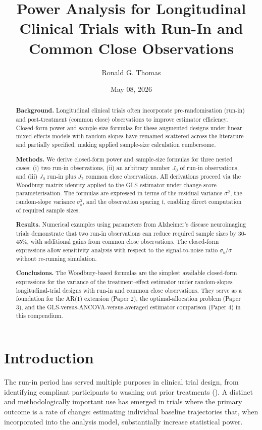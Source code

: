 \documentclass[
  11pt,
]{article}
\title{Power Analysis for Longitudinal Clinical Trials with Run-In and
Common Close Observations}
\author{Ronald G. Thomas}
\date{May 08, 2026}
\begin{document}
\maketitle
\begin{abstract}
\textbf{Background.} Longitudinal clinical trials often incorporate
pre-randomisation (run-in) and post-treatment (common close)
observations to improve estimator efficiency. Closed-form power and
sample-size formulas for these augmented designs under linear
mixed-effects models with random slopes have remained scattered across
the literature and partially specified, making applied sample-size
calculation cumbersome.

\textbf{Methods.} We derive closed-form power and sample-size formulas
for three nested cases: (i) two run-in observations, (ii) an arbitrary
number \(J_0\) of run-in observations, and (iii) \(J_0\) run-in plus
\(J_2\) common close observations. All derivations proceed via the
Woodbury matrix identity applied to the GLS estimator under change-score
parameterisation. The formulas are expressed in terms of the residual
variance \(\sigma^2\), the random-slope variance \(\sigma_b^2\), and the
observation spacing \(t\), enabling direct computation of required
sample sizes.

\textbf{Results.} Numerical examples using parameters from Alzheimer's
disease neuroimaging trials demonstrate that two run-in observations can
reduce required sample sizes by 30-45\%, with additional gains from
common close observations. The closed-form expressions allow sensitivity
analysis with respect to the signal-to-noise ratio \(\sigma_b / \sigma\)
without re-running simulation.

\textbf{Conclusions.} The Woodbury-based formulas are the simplest
available closed-form expressions for the variance of the
treatment-effect estimator under random-slopes longitudinal-trial
designs with run-in and common close observations. They serve as a
foundation for the AR(1) extension (Paper 2), the optimal-allocation
problem (Paper 3), and the GLS-versus-ANCOVA-versus-averaged estimator
comparison (Paper 4) in this compendium.
\end{abstract}

{
\setcounter{tocdepth}{2}
\tableofcontents
}
\section{Introduction}\label{introduction}

The run-in period has served multiple purposes in clinical trial design,
from identifying compliant participants to washing out prior treatments
(). A distinct and
methodologically important use has emerged in trials where the primary
outcome is a rate of change: estimating individual baseline trajectories
that, when incorporated into the analysis model, substantially increase
statistical power.
\end{document}
